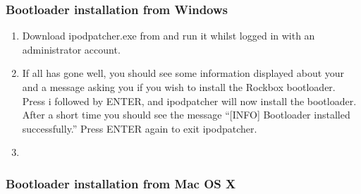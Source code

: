 
\subsubsection{Bootloader installation from Windows}

\begin{enumerate}

\item Download ipodpatcher.exe from 
and run it whilst logged in with an administrator account.

\item If all has gone well, you should see some information displayed about
your \dap{} and a message asking you if you wish to install the Rockbox
bootloader. Press i followed by ENTER, and ipodpatcher will now
install the bootloader. After a short time you should see the message
``[INFO] Bootloader installed successfully.'' Press ENTER again to exit
ipodpatcher.

\item {}

\end{enumerate}

\subsubsection{Bootloader installation from Mac OS X}

